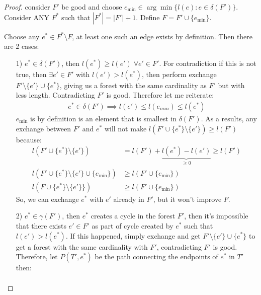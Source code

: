 \documentclass[]{article}
\theoremstyle{definition}
\begin{document}
        \begin{proof}
            consider $F'$ be good and choose $e_{\min}\in \arg\min \{l(e): e\in \delta(F')\}$. Consider ANY $F^*$ such that $|F^*| = |F'| + 1$. Define $F = F'\cup\{e_{\min}\}$. 
            \par
            Choose any $e^* \in F^*\setminus F$, at least one such an edge exists by definition. Then there are 2 cases: 
            \begin{itemize}
                \item [1)] $e^*\in \delta(F')$, then $l(e^*) \ge l(e')\;\forall e' \in F'$. For contradiction if this is not true, then $\exists e'\in F'$ with $l(e')> l(e^*)$, then perform exchange $F'\setminus \{e'\}\cup\{e^*\}$, giving us a forest with the same cardinality as $F'$ but with less length. Contradicting $F'$ is good. Therefore let me reiterate: 
                \begin{align}
                    e^*\in \delta(F')\implies l(e')\le l(e_{min})\le l(e^*) 
                \end{align}
                $e_{\min}$ is by definition is an element that is smallest in $\delta (F')$. As a results, any exchange between $F'$ and $e^*$ will not make $l(F'\cup\{e^*\}\setminus \{e'\}) \ge l(F')$ because: 
                \begin{align}
                    l(F'\cup\{e^*\}\setminus \{e'\}) 
                    &= l(F') + \underbrace{l(e^*) - l(e')}_{\ge 0}
                    \ge l(F')
                    \\
                    l(F'\cup\{e^*\}\setminus \{e'\}\cup \{e_{\min}\}) 
                    &\ge l(F'\cup \{e_{\min}\})
                    \\
                    l(F\cup\{e^*\}\setminus \{e'\}\}) 
                    &\ge l(F'\cup \{e_{\min}\})
                \end{align}
                So, we can exchange $e^*$ with $e'$ already in $F'$, but it won't improve $F$. 
                \item[2)] $e^*\in \gamma(F')$, then $e^*$ creates a cycle in the forest $F'$, then it's impossible that there exists $e' \in F'$ as part of  cycle created by $e^*$ such that $l(e') > l(e^*)$. If this happened, simply exchange and get $F'\setminus \{e'\}\cup \{e^*\}$ to get a forest with the same cardinality with $F'$, contradicting $F'$ is good. Therefore, let $P(T', e^*)$ be the path connecting the endpoints of $e^*$ in $T'$ then: 
                \begin{align}

\end{align}
\end{itemize}
\end{proof}
\end{document}
